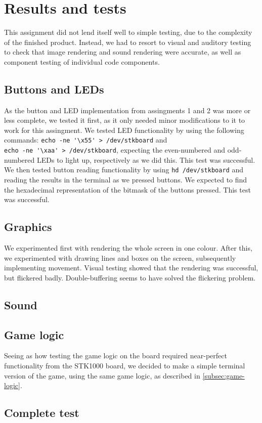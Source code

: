 \section{Results and tests}
This assignment did not lend itself well to simple testing, due to the
complexity of the finished product. Instead, we had to resort to visual
and auditory testing to check that image rendering and sound rendering
were accurate, as well as component testing of individual code
components.


\subsection{Buttons and LEDs}
As the button and LED implementation from assingments 1 and 2 was more
or less complete, we tested it first, as it only needed minor
modifications to it to work for this assingment.  We tested LED
functionality by using the following commands: 
\verb|echo -ne '\x55' > /dev/stkboard| and \\
\verb|echo -ne '\xaa' > /dev/stkboard|,
expecting the even-numbered and odd-numbered LEDs to light up,
respectively as we did this. This test was successful.  We then tested
button reading functionality by using \texttt{hd /dev/stkboard} and
reading the results in the terminal as we pressed buttons. We expected
to find the hexadecimal representation of the bitmask of the buttons
pressed. This test was successful.

\subsection{Graphics}
We experimented first with rendering the whole screen in one colour.
After this, we experimented with drawing lines and boxes on the screen,
subsequently implementing movement. Visual testing showed that the
rendering was successful, but flickered badly.  Double-buffering seems
to have solved the flickering problem. %

\subsection{Sound}
\subsection{Game logic}
Seeing as how testing the game logic on the board required near-perfect
functionality from the STK1000 board, we decided to make a simple
terminal version of the game, using the same game logic, as described in
\ref{subsec:game-logic}. 

\subsection{Complete test}

